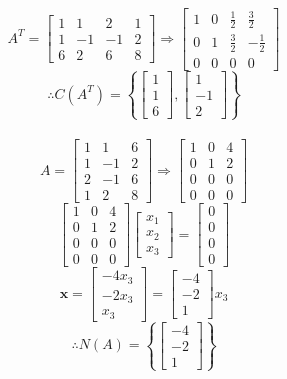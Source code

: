 $$A^T=\begin{bmatrix}
    1&1&2&1\\1&-1&-1&2\\6&2&6&8
\end{bmatrix}\Rightarrow\begin{bmatrix}
    1&0&\frac{1}{2}&\frac{3}{2}\\
    0&1&\frac{3}{2}&-\frac{1}{2}\\
    0&0&0&0
\end{bmatrix}$$
$$\therefore C(A^T) = \left\{\begin{bmatrix}
    1\\1\\6
\end{bmatrix},\begin{bmatrix}
    1\\-1\\2
\end{bmatrix}\right\}$$\\

$$A=\begin{bmatrix}
    1&1&6\\
    1&-1&2\\
    2&-1&6\\
    1&2&8
\end{bmatrix}\Rightarrow\begin{bmatrix}
    1&0&4\\
    0&1&2\\
    0&0&0\\
    0&0&0
\end{bmatrix}$$
$$\begin{bmatrix}
    1&0&4\\
    0&1&2\\
    0&0&0\\
    0&0&0
\end{bmatrix}\begin{bmatrix}
    x_1\\x_2\\x_3
\end{bmatrix}=\begin{bmatrix}
    0\\0\\0\\0
\end{bmatrix}$$
$$\mathbf{x}=\begin{bmatrix}
    -4x_3\\
    -2x_3\\
    x_3
\end{bmatrix}=\begin{bmatrix}
    -4\\-2\\1
\end{bmatrix}x_3$$
$$\therefore N(A)=\left\{\begin{bmatrix}
    -4\\-2\\1
\end{bmatrix}\right\}$$\\

